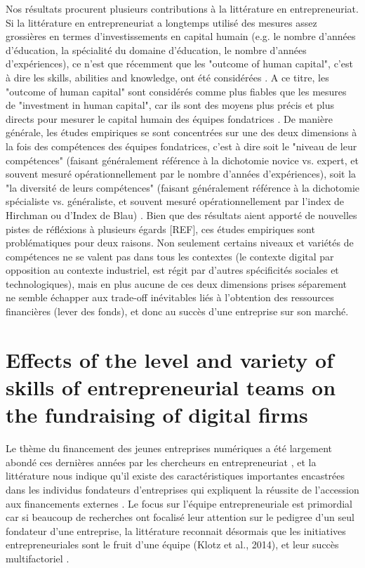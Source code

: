 \documentclass[11pt]{article}
\begin{document}
Nos résultats procurent plusieurs contributions à la littérature en entrepreneuriat. Si la littérature en entrepreneuriat a longtemps utilisé des mesures assez grossières en termes d'investissements en capital humain (e.g. le nombre d'années d'éducation, la spécialité du domaine d'éducation, le nombre d'années d'expériences), ce n'est que récemment que les "outcome of human capital", c'est à dire les skills, abilities and knowledge, ont été considérées \citep{marvel2016human}. A ce titre, les "outcome of human capital" sont considérés comme plus fiables que les mesures de "investment in human capital", car ils sont des moyens plus précis et plus directs pour mesurer le capital humain des équipes fondatrices \citep{unger2011human}. De manière générale, les études empiriques se sont concentrées sur une des deux dimensions à la fois des compétences des équipes fondatrices, c'est à dire soit le "niveau de leur compétences" (faisant généralement référence à la dichotomie novice vs. expert, et souvent mesuré opérationnellement par le nombre d'années d'expériences), soit la "la diversité de leurs compétences" (faisant généralement référence à la dichotomie spécialiste vs. généraliste, et souvent mesuré opérationnellement par l'index de Hirchman ou d'Index de Blau) \citep{harrison2007s}. Bien que des résultats aient apporté de nouvelles pistes de réfléxions à plusieurs égards [REF], ces études empiriques sont problématiques pour deux raisons. Non seulement certains niveaux et variétés de compétences ne se valent pas dans tous les contextes (le contexte digital par opposition au contexte industriel, est régit par d'autres spécificités sociales et technologiques), mais en plus aucune de ces deux dimensions prises séparement ne semble échapper aux trade-off inévitables liés à l'obtention des ressources financières (lever des fonds), et donc au succès d'une entreprise sur son marché.

\section{Effects of the level and variety of skills of entrepreneurial teams on the fundraising of digital firms}

Le thème du financement des jeunes entreprises numériques a été largement abondé ces dernières années par les chercheurs en entrepreneuriat \citep{klein2020start}, et la littérature nous indique qu'il existe des caractéristiques importantes encastrées dans les individus fondateurs d'entreprises qui expliquent la réussite de l'accession aux financements externes \citep{pinelli2020too, reese2020should}. Le focus sur l'équipe entrepreneuriale est primordial car si beaucoup de recherches ont focalisé leur attention sur le pedigree d'un seul fondateur d'une entreprise, la littérature reconnait désormais que les initiatives entrepreneuriales sont le fruit d'une équipe (Klotz et al., 2014), et leur succès multifactoriel \citep{roure1990predictors}.
\end{document}
